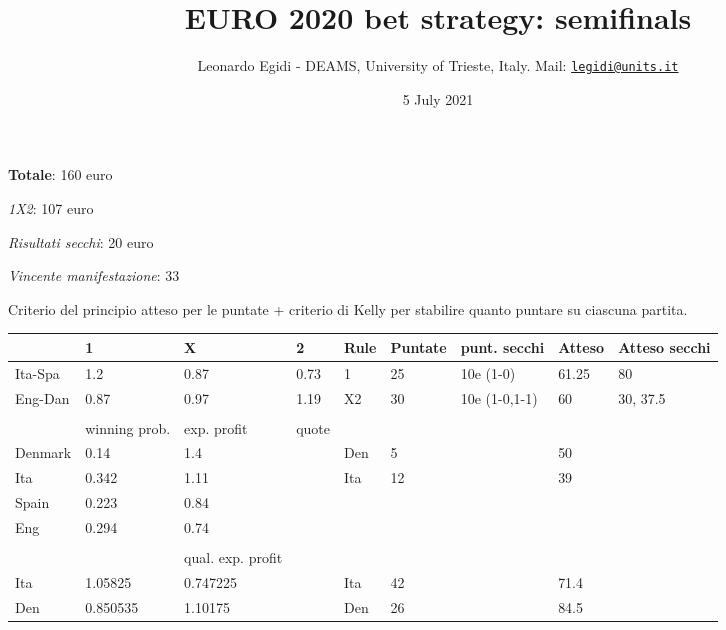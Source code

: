 \documentclass[
  10pt,
]{article}
\title{EURO 2020 bet strategy: semifinals}
\author{Leonardo Egidi - DEAMS, University of Trieste, Italy. Mail:
\href{mailto:legidi@units.it}{\nolinkurl{legidi@units.it}}}
\date{5 July 2021}
\begin{document}
\maketitle

{
\setcounter{tocdepth}{2}
\tableofcontents
}
\textbf{Totale}: 160 euro

\emph{1X2}: 107 euro

\emph{Risultati secchi}: 20 euro

\emph{Vincente manifestazione}: 33

Criterio del principio atteso per le puntate + criterio di Kelly per
stabilire quanto puntare su ciascuna partita.

\begin{longtable}[]{@{}lllllllll@{}}
\toprule
& 1 & X & 2 & Rule & Puntate & punt. secchi & Atteso & Atteso
secchi\tabularnewline
\midrule
\endhead
Ita-Spa & 1.2 & 0.87 & 0.73 & 1 & 25 & 10e (1-0) & 61.25 &
80\tabularnewline
Eng-Dan & 0.87 & 0.97 & 1.19 & X2 & 30 & 10e (1-0,1-1) & 60 &
30, 37.5\tabularnewline
&  &  & & & & \tabularnewline
& winning prob. & exp. profit & quote  & & & \tabularnewline
\bottomrule
Denmark & 0.14 & 1.4 & & Den & 5 & & 50 &\tabularnewline
Ita & 0.342 & 1.11 & & Ita & 12 & & 39 &\tabularnewline
Spain & 0.223 & 0.84 & & & & & &\tabularnewline
Eng & 0.294 & 0.74 & & & & & &\tabularnewline
&  &  & & & & \tabularnewline
& &qual. exp. profit &   & & & \tabularnewline
\bottomrule
Ita & 1.05825 & 0.747225 & & Ita & 42 & & 71.4 &\tabularnewline
Den & 0.850535 & 1.10175 & & Den & 26 & & 84.5 &\tabularnewline
\bottomrule
\end{longtable}
\end{document}
